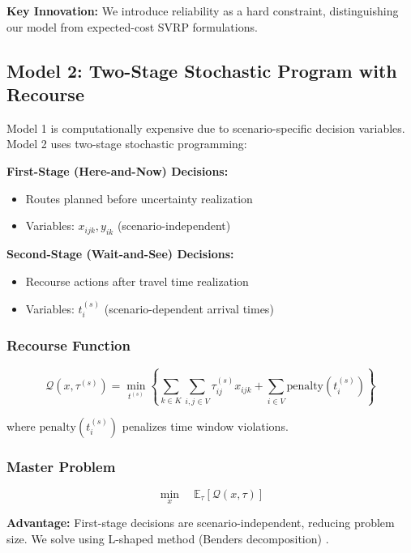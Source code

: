 \textbf{Key Innovation:} We introduce reliability as a hard constraint, distinguishing our model from expected-cost SVRP formulations.

\subsection{Model 2: Two-Stage Stochastic Program with Recourse}

Model 1 is computationally expensive due to scenario-specific decision variables. Model 2 uses two-stage stochastic programming:

\textbf{First-Stage (Here-and-Now) Decisions:}
\begin{itemize}
\item Routes planned before uncertainty realization
\item Variables: $x_{ijk}, y_{ik}$ (scenario-independent)
\end{itemize}

\textbf{Second-Stage (Wait-and-See) Decisions:}
\begin{itemize}
\item Recourse actions after travel time realization
\item Variables: $t_i^{(s)}$ (scenario-dependent arrival times)
\end{itemize}

\subsubsection{Recourse Function}

\begin{equation}
\mathcal{Q}(x, \tau^{(s)}) = \min_{t^{(s)}} \left\{ \sum_{k \in K} \sum_{i,j \in V} \tau_{ij}^{(s)} x_{ijk} + \sum_{i \in V} \text{penalty}(t_i^{(s)}) \right\}
\end{equation}

where $\text{penalty}(t_i^{(s)})$ penalizes time window violations.

\subsubsection{Master Problem}

\begin{equation}
\min_{x} \quad \mathbb{E}_\tau[\mathcal{Q}(x, \tau)]
\end{equation}

\textbf{Advantage:} First-stage decisions are scenario-independent, reducing problem size. We solve using L-shaped method (Benders decomposition) \cite{Birge2011}.


